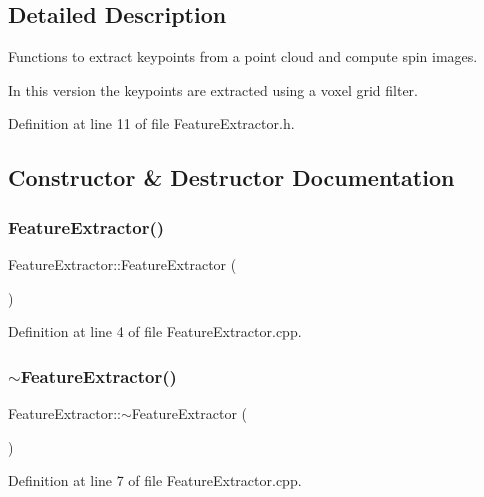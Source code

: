 \subsection{Detailed Description}
Functions to extract keypoints from a point cloud and compute spin images. 

In this version the keypoints are extracted using a voxel grid filter. 

Definition at line 11 of file Feature\+Extractor.\+h.



\subsection{Constructor \& Destructor Documentation}
\mbox{\label{class_feature_extractor_a58c705d663551bfa7baea3d75614311f}} 
\subsubsection{\texorpdfstring{Feature\+Extractor()}{FeatureExtractor()}}
{\footnotesize\ttfamily Feature\+Extractor\+::\+Feature\+Extractor (\begin{DoxyParamCaption}{ }\end{DoxyParamCaption})}



Definition at line 4 of file Feature\+Extractor.\+cpp.

\mbox{\label{class_feature_extractor_ad87b36879a01dcfe45f57318d2850c54}} 
\subsubsection{\texorpdfstring{$\sim$\+Feature\+Extractor()}{~FeatureExtractor()}}
{\footnotesize\ttfamily Feature\+Extractor\+::$\sim$\+Feature\+Extractor (\begin{DoxyParamCaption}{ }\end{DoxyParamCaption})}



Definition at line 7 of file Feature\+Extractor.\+cpp.



